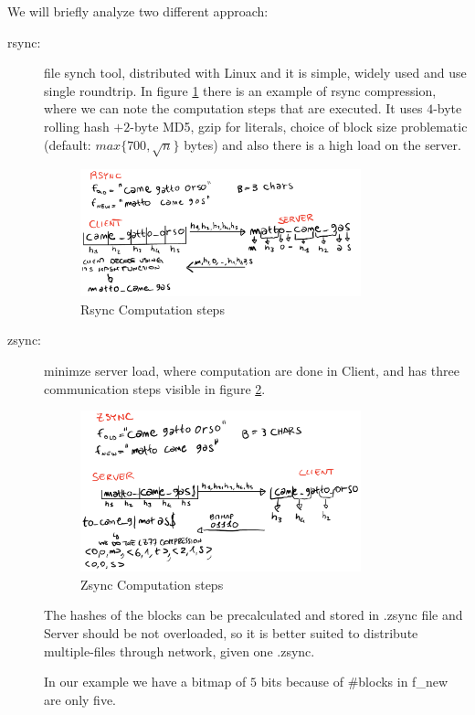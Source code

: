 We will briefly analyze two different approach:
\begin{description}
	\item [rsync: ] file synch tool, distributed with Linux and it is simple, widely used and
	                use single roundtrip.\newline
			In figure \ref{img:rsync} there is an example of rsync compression, where we can
			note the computation steps that are executed.\newline
			It uses $4$-byte rolling hash $+ 2$-byte MD5, gzip for literals,
			choice of block size problematic (default: $max\{700, \sqrt{n}\}$ bytes)
			and also there is a high load on the server.

			\begin{figure}
				\includegraphics[width=0.8\textwidth]{Images/rsync}
				\caption{Rsync Computation steps}
				\label{img:rsync}
			\end{figure}

	\item [zsync: ] minimze server load, where computation are done in Client, and has 
			three communication steps visible in figure \ref{img:zsync}.

			\begin{figure}
				\includegraphics[width=0.8\textwidth]{Images/zsync}
				\caption{Zsync Computation steps}
				\label{img:zsync}
			\end{figure}
			The hashes of the blocks can be precalculated and stored in .zsync file
			and Server should be not overloaded, so it is better suited to 
			distribute multiple-files through network, given one .zsync.

			In our example we have a bitmap of $5$ bits because of \#blocks in
			f\_new are only five.

\end{description}
